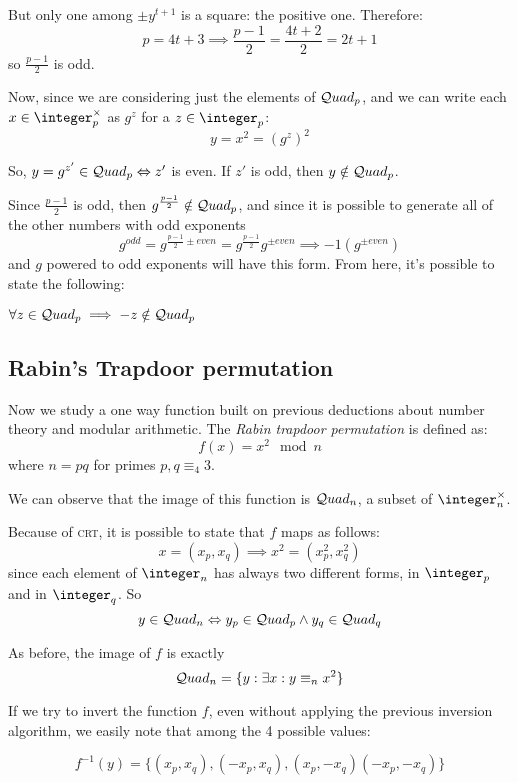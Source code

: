 But only one among $\pm y^{t + 1}$ is a square: the positive one. Therefore:
\[ 
    p = 4t + 3 \implies \frac{p - 1}{2} = \frac{4t + 2}{2} = 2t + 1
\]
so $\frac{p - 1}{2}$ is odd.

Now, since we are considering just the elements of $\mathcal{Q}uad_p$, and we can write each $x \in \integer_p^\times$ as $g^{z}$ for a $z \in \integer_p$:
\[
    y = x^2  = (g^z)^2
\]

So, $y = g^{z'} \in \mathcal{Q}uad_p \Leftrightarrow z'$ is even. If $z'$ is odd, then $y \notin \mathcal{Q}uad_p$.

Since $\frac{p - 1}{2}$ is odd, then $g^{\frac{p - 1}{2}} \notin \mathcal{Q}uad_p$, and since it is possible to generate all of the other numbers with odd exponents 
\[
    g^{odd}=g^{\frac{p-1}{2} \pm even} = g^{\frac{p-1}{2}}g^{ \pm even} \implies -1(g^{\pm even})
\]
and $g$ powered to odd exponents will have this form. From here, it's possible to state the following:

\begin{lemma}
    $\forall z \in \mathcal{Q}uad_p \implies -z \notin \mathcal{Q}uad_p$
\end{lemma}

\subsection{Rabin's Trapdoor permutation}

Now we study a one way function built on previous deductions about number theory and modular arithmetic. The \emph{Rabin trapdoor permutation} is defined as: 
\[
    f(x) = x^2 \mod n
\]
where $n = pq$ for primes $p, q \equiv_4 3$.

We can observe that the image of this function is $\mathcal{Q}uad_n$, a subset of $\integer_n^\times$.

Because of \textsc{crt}, it is possible to state that $f$ maps as follows:
\[
    x = (x_p, x_q) \implies x^2 = (x^2_p, x^2_q)
\]
since each element of $\integer_n$ has always two different forms, in $\integer_p$ and in $\integer_q$. So
\[
    y \in  \mathcal{Q}uad_n \Leftrightarrow y_p \in \mathcal{Q}uad_p \wedge y_q \in \mathcal{Q}uad_q
\]

As before, the image of $f$ is exactly
\[
    \mathcal{Q}uad_n = \{ y : \exists x : y \equiv_n x^2\}
\]

If we try to invert the function $f$, even without applying the previous inversion algorithm, we easily note that among the 4 possible values:

\[
    f^{-1}(y) = \{(x_p, x_q),(-x_p, x_q),(x_p, -x_q)(-x_p, -x_q)\}
\]

